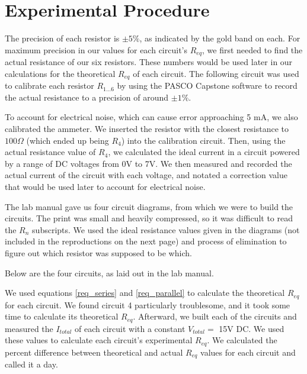 \documentclass[12pt,letterpaper,titlepage]{report}
\begin{document}

\bigskip
\section*{Experimental Procedure}

The precision of each resistor is $\pm 5 \%$, as indicated by the gold band on each. For maximum precision in our values for each circuit's $R_{eq}$, we first needed to find the actual resistance of our six resistors. These numbers would be used later in our calculations for the theoretical $R_{eq}$ of each circuit. The following circuit was used to calibrate each resistor $R_{1 \ldots 6}$ by using the PASCO Capstone software to record the actual resistance to a precision of around $\pm 1\%$.

\begin{center}
    
\end{center}

To account for electrical noise, which can cause error approaching 5 mA, we also calibrated the ammeter. We inserted the resistor with the closest resistance to $100 \Omega$ (which ended up being $R_4$) into the calibration circuit. Then, using the actual resistance value of $R_4$, we calculated the ideal current in a circuit powered by a range of DC voltages from 0V to 7V. We then measured and recorded the actual current of the circuit with each voltage, and notated a correction value that would be used later to account for electrical noise.

\medskip
The lab manual gave us four circuit diagrams, from which we were to build the circuits. The print was small and heavily compressed, so it was difficult to read the $R_n$ subscripts. We used the ideal resistance values given in the diagrams (not included in the reproductions on the next page) and process of elimination to figure out which resistor was supposed to be which.

\pagebreak
Below are the four circuits, as laid out in the lab manual.

\bigskip
\begin{minipage}{\textwidth}
    \centering
    \bigskip
    
    \bigskip
\end{minipage}

\medskip
We used equations \ref{req_series} and \ref{req_parallel} to calculate the theoretical $R_{eq}$ for each circuit. We found circuit 4 particularly troublesome, and it took some time to calculate its theoretical $R_{eq}$. Afterward, we built each of the circuits and measured the $I_{total}$ of each circuit with a constant $V_{total} =$ 15V DC. We used these values to calculate each circuit's experimental $R_{eq}$. We calculated the percent difference between theoretical and actual $R_{eq}$ values for each circuit and called it a day.
\end{document}

